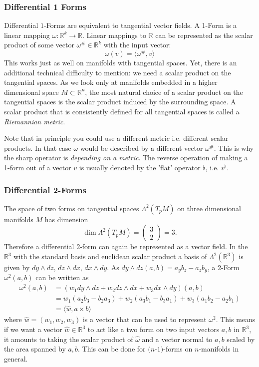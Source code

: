 \subsubsection*{Differential 1 Forms}
Differential $1$-Forms are equivalent to tangential vector fields. A 1-Form is a linear mapping $\omega: \mathbb R^k \rightarrow \mathbb R$. Linear mappings to $\mathbb R$ can be represented as the scalar product of some vector $\omega^{\#} \in \mathbb R ^k$ with the input vector:
\[\omega(v) = \langle \omega^{\#}, v \rangle\]
This works just as well on manifolds with tangential spaces. Yet, there is an additional technical difficulty to mention: we need a scalar product on the tangential spaces. As we look only at manifolds embedded in a higher dimensional space $M \subset \mathbb R^n$, the most natural choice of a scalar product on the tangential spaces is the scalar product induced by the surrounding space. A scalar product that is consistently defined for all tangential spaces is called a \emph{Riemannian metric}.

Note that in principle you could use a different metric i.e. different scalar products. In that case $\omega$ would be described by a different vector $\omega^{\#}$. This is why the sharp operator is \emph{depending on a metric}. The reverse operation of making a 1-form out of a vector $v$ is usually denoted by the 'flat' operator $\flat$, i.e. $v^\flat$.

\subsubsection*{Differential 2-Forms}
The space of two forms on tangential spaces $\Lambda^2(T_pM)$ on three dimensional manifolds $M$ has dimension \[\dim\Lambda^2(T_pM) =\begin{pmatrix}
3\\
2
\end{pmatrix} =3.\] Therefore a differential $2$-form can again be represented as a vector field. In the $\mathbb R^3$ with the standard basis and euclidean scalar product a basis of $\Lambda^2(\mathbb R^3)$ is given by $dy \wedge dz$, $dz \wedge dx$, $dx \wedge dy$. As $dy \wedge dz (a,b) = a_yb_z -a_zb_y$,  a 2-Form $\omega^2(a,b)$ can be written as
\begin{align*}
\omega^2(a,b) &= (w_1 dy \wedge dz + w_2 dz \wedge dx + w_3 dx \wedge dy)(a,b) \\
&= w_1(a_2b_3 - b_2 a_3) + w_2(a_3b_1-b_3a_1) + w_3(a_1b_2 - a_2b_1) \\
&= \langle \widehat{w}, a \times b \rangle\end{align*} 
where $\widehat{w} = (w_1,w_2,w_3)$ is a vector that can be used to represent $\omega^2$. This means if we want a vector $\widehat{w} \in \mathbb R^3$ to act like a two form on two input vectors $a,b$ in $\mathbb R^3$, it amounts to taking the scalar product of $\widehat{\omega}$ and a vector normal to $a,b$ scaled by the area spanned by $a,b$. 
This can be done for $(n$-$1)$-forms on $n$-manifolds in general.


